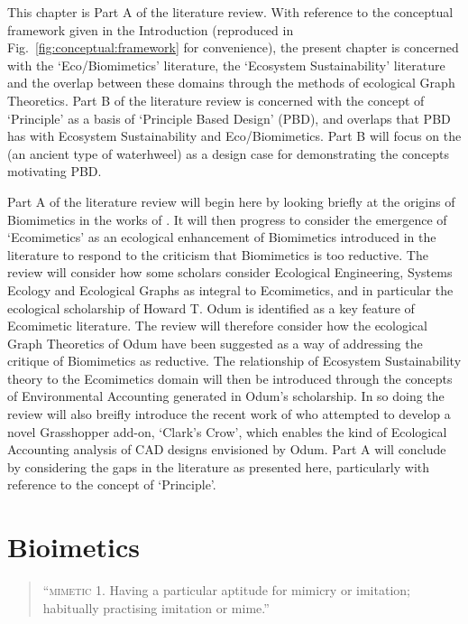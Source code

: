 This chapter is Part A of the literature review. With reference to the conceptual framework given in the Introduction (reproduced in Fig.~\ref{fig:conceptual:framework} for convenience), the present chapter is concerned with the `Eco/Biomimetics' literature, the `Ecosystem Sustainability' literature and the overlap between these domains through the methods of ecological Graph Theoretics. Part B of the literature review is concerned with the concept of `Principle' as a basis of `Principle Based Design' (PBD), and overlaps that PBD has with Ecosystem Sustainability and Eco/Biomimetics. Part B will focus on the \SEs (an ancient type of waterhweel) as a design case for demonstrating the concepts motivating PBD.

Part A of the literature review will begin here by looking briefly at the origins of Biomimetics in the works of \citeauthor{schmitt_biomimetic_1973}. It will then progress to consider the emergence of `Ecomimetics' as an ecological enhancement of Biomimetics introduced in the literature to respond to the criticism that Biomimetics is too reductive. The review will consider how some scholars consider Ecological Engineering, Systems Ecology and Ecological Graphs as integral to Ecomimetics, and in particular the ecological scholarship of Howard T. Odum is identified as a key feature of Ecomimetic literature. The review will therefore consider how the ecological Graph Theoretics of Odum have been suggested as a way of addressing the critique of Biomimetics as reductive. The relationship of Ecosystem Sustainability theory to the Ecomimetics domain will then be introduced through the concepts of Environmental Accounting generated in Odum's scholarship. In so doing the review will also breifly introduce the recent work of \citeauthor{keena_clark_2018} who attempted to develop a novel Grasshopper add-on, `Clark's Crow', which enables the kind of Ecological Accounting analysis of CAD designs envisioned by Odum. Part A will conclude by considering the gaps in the literature as presented here, particularly with reference to the concept of `Principle'. 

\section{Bioimetics}

\begin{quotation}
    ``\textsc{mimetic} 1. Having a particular aptitude for mimicry or imitation; habitually practising imitation or mime.'' \cite{oed_mimetic_2002}
\end{quotation}

